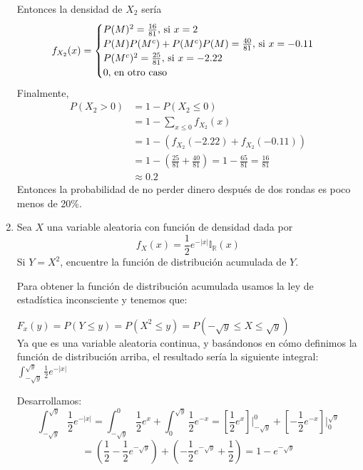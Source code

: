 \documentclass[12pt,a4paper]{report}
\begin{document}
\begin{enumerate}
{			Entonces la densidad de $X_2$ sería
			\[
				f_{X_2}(x) = \begin{cases}
							P(M)^2 = \frac{16}{81}, $ si $ x = 2\\
							P(M)P(M^c) + P(M^c)P(M) = \frac{40}{81}, $ si $ x = -0.11\\
							P(M^c)^2 = \frac{25}{81}, $ si $ x = -2.22\\
							0, $ en otro caso$
						 \end{cases}
			\]
			Finalmente,
			\begin{align*}
				P(X_2 > 0) &= 1 - P(X_2 \leq 0) \\
						 &= 1 - \sum_{x \leq 0}{f_{X_2}(x)}\\
						 &= 1 - (f_{X_2}(-2.22)+f_{X_2}(-0.11))\\
						 &= 1 - (\frac{25}{81} + \frac{40}{81})
						 = 1- \frac{65}{81}
						 = \frac{16}{81}\\
						 &\approx 0.2
			\end{align*}
			Entonces la probabilidad de no perder dinero después de dos rondas
			es poco menos de 20\%.

		}

		\item {
			Sea $X$ una variable aleatoria con función de densidad dada por
			\[f_X(x) = \frac{1}{2}e^{-|x|}\mathbb{I}_{\mathbb{R}}(x)\]
			Si $Y = X^2$, encuentre la función de distribución acumulada de $Y$.
			
			Para obtener la función de distribución acumulada usamos la ley de estadística inconsciente y tenemos que:
			
		$F_{x}(y) = P(Y \leq y) = P(X^2\leq y) = P(-\sqrt{y} \leq X \leq \sqrt{y})$	\\
					
			Ya que es una variable aleatoria continua, y basándonos en cómo definimos la función de distribución arriba, el resultado sería la siguiente integral:
			$\int_{-\sqrt{y}}^{\sqrt{y}} \frac{1}{2}e^{-|x|}$			
			
			Desarrollamos:
			 \[
               \int_{-\sqrt{y}}^{\sqrt{y}} \frac{1}{2}e^{-|x|}
                =
                 \int_{-\sqrt{y}}^{0} \frac{1}{2}e^{x} 
                 +
                 \int_{0}^{\sqrt{y}} \frac{1}{2}e^{-x}
                =
                 \left[\frac{1}{2}e^{x}\right]\Big|_{-\sqrt{y}}^{0}
                 +
                 \left[-\frac{1}{2}e^{-x}\right]\Big|_{0}^{\sqrt{y}}
             \]        
             \[
                           =
                \left(\frac{1}{2} - \frac{1}{2}e^{-\sqrt{y}}\right)
                +
                \left(- \frac{1}{2}e^{-\sqrt{y}} + \frac{1}{2}\right)
                =
                1 - e^{-\sqrt{y}}
            \]        
            
}
\end{enumerate}
\end{document}
